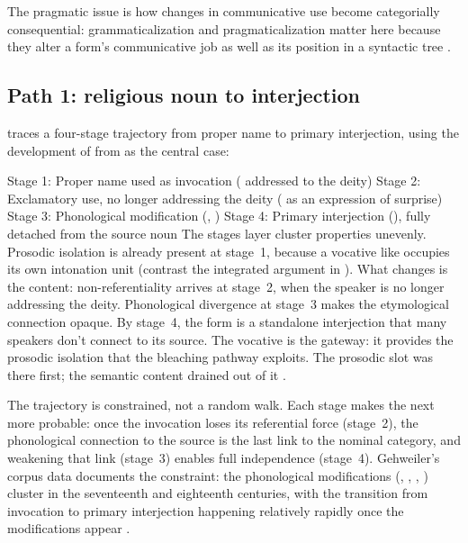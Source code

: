 \documentclass[12pt]{article}
\begin{document}
The pragmatic issue is how changes in communicative use become
categorially consequential: grammaticalization and pragmaticalization
matter here because they alter a form's communicative job as well as its
position in a syntactic tree
\citep[cf.][]{TraugottDasher2002, heinekuteva2002lexicon}.

\subsection{Path 1: religious noun to interjection}

\textcite{gehweiler2008} traces a four-stage trajectory from proper name to
primary interjection, using the development of  from
 as the central case:

\ea\label{ex:bleaching}
  \ea Stage 1: Proper name used as invocation ( addressed
    to the deity)
  \ex Stage 2: Exclamatory use, no longer addressing the deity
    ( as an expression of surprise)
  \ex Stage 3: Phonological modification (, )
  \ex Stage 4: Primary interjection (), fully detached from
    the source noun
  \z
\z
The stages layer cluster properties unevenly. Prosodic isolation is
already present at stage~1, because a vocative like
 occupies its own intonation unit (contrast the
integrated argument in ). What changes
is the content: non-referentiality arrives at stage~2, when the speaker
is no longer addressing the deity. Phonological divergence at stage~3
makes the etymological connection opaque. By stage~4, the form is a
standalone interjection that many speakers don't connect to its source.
The vocative is the gateway: it provides the prosodic isolation that
the bleaching pathway exploits. The prosodic slot was there first; the
semantic content drained out of it \citep[85]{gehweiler2008}.

The trajectory is constrained, not a random walk. Each stage makes the
next more probable: once the invocation loses its referential force
(stage~2), the phonological connection to the source is the last link
to the nominal category, and weakening that link (stage~3) enables full
independence (stage~4). Gehweiler's corpus data documents the
constraint: the phonological modifications (,
, , ) cluster in the
seventeenth and eighteenth centuries, with the transition from
invocation to primary interjection happening relatively rapidly once the
modifications appear \citep[80--85]{gehweiler2008}.
\end{document}
